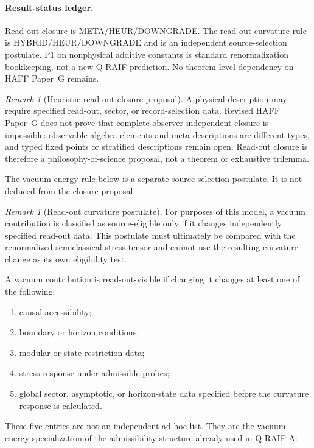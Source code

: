 \documentclass[12pt,a4paper]{article}
\theoremstyle{definition}
\theoremstyle{remark}
\newtheorem{remark}[theorem]{Remark}
\newcommand{\tightlist}{%
  \setlength{\itemsep}{0pt}\setlength{\parskip}{0pt}}
\begin{document}
\paragraph{Result-status ledger.}
Read-out closure is META/HEUR/DOWNGRADE.  The read-out curvature rule is HYBRID/HEUR/DOWNGRADE and is an independent source-selection postulate.  P1 on nonphysical additive constants is standard renormalization bookkeeping, not a new Q-RAIF prediction.  No theorem-level dependency on HAFF Paper~G remains.

\begin{remark}[Heuristic read-out closure proposal]
A physical description may require specified read-out, sector, or record-selection data.  Revised HAFF Paper~G does not prove that complete observer-independent closure is impossible: observable-algebra elements and meta-descriptions are different types, and typed fixed points or stratified descriptions remain open.  Read-out closure is therefore a philosophy-of-science proposal, not a theorem or exhaustive trilemma.
\end{remark}

The vacuum-energy rule below is a separate source-selection postulate.  It is not deduced from the closure proposal.

\begin{remark}[Read-out curvature postulate]
For purposes of this model, a vacuum contribution is classified as source-eligible only if it changes independently specified read-out data.  This postulate must ultimately be compared with the renormalized semiclassical stress tensor and cannot use the resulting curvature change as its own eligibility test.
\end{remark}

A vacuum contribution is read-out-visible if changing it changes at least one of the following:

\begin{enumerate}[leftmargin=*]
\tightlist
\item causal accessibility;
\item boundary or horizon conditions;
\item modular or state-restriction data;
\item stress response under admissible probes;
\item global sector, asymptotic, or horizon-state data specified before the curvature response is calculated.
\end{enumerate}

These five entries are not an independent ad hoc list. They are the vacuum-energy specialization of the admissibility structure already used in Q-RAIF A:
\end{document}
